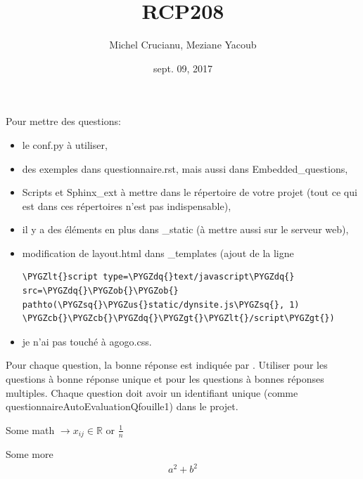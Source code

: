 \documentclass[a4paper,10pt,french]{sphinxmanual}
\title{RCP208}
\date{sept. 09, 2017}
\author{Michel Crucianu, Meziane Yacoub}
\def\PYGZus{\char`\_}
\def\PYGZob{\char`\{}
\def\PYGZcb{\char`\}}
\def\PYGZlt{\char`\<}
\def\PYGZgt{\char`\>}
\def\PYGZsq{\char`\'}
\def\PYGZdq{\char`\"}
\renewcommand\PYGZsq{\textquotesingle}
\begin{document}
\maketitle
\tableofcontents
{}\label{index::doc}\label{coursIntroduction:chap-coursintroduction}
Pour mettre des questions:
\begin{itemize}
\item {} 
le conf.py à utiliser,

\item {} 
des exemples dans questionnaire.rst, mais aussi dans Embedded\_questions,

\item {} 
Scripts et Sphinx\_ext à mettre dans le répertoire de votre projet (tout ce qui est dans ces répertoires n'est pas indispensable),

\item {} 
il y a des éléments en plus dans \_static (à mettre aussi sur le serveur web),

\item {} 
modification de layout.html dans \_templates (ajout de la ligne

\begin{Verbatim}[commandchars=\\\{\}]
\PYGZlt{}script type=\PYGZdq{}text/javascript\PYGZdq{} src=\PYGZdq{}\PYGZob{}\PYGZob{} pathto(\PYGZsq{}\PYGZus{}static/dynsite.js\PYGZsq{}, 1) \PYGZcb{}\PYGZcb{}\PYGZdq{}\PYGZgt{}\PYGZlt{}/script\PYGZgt{})
\end{Verbatim}

\item {} 
je n'ai pas touché à agogo.css.

\end{itemize}

Pour chaque question, la bonne réponse est indiquée par .
Utiliser  pour les questions à bonne réponse unique et
 pour les questions à bonnes réponses multiples. Chaque question doit avoir un
identifiant unique (comme questionnaireAutoEvaluationQfouille1) dans le projet.



Some math \(\rightarrow x_{ij} \in \mathbb{R}\) or \(\frac{1}{n}\)

Some more
\begin{equation*}
\begin{split}a^2 + b^2\end{split}
\end{equation*}


\renewcommand{\indexname}{Index}
\printindex
\end{document}
